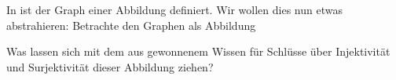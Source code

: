 \begin{exercise}
  In  ist der Graph einer Abbildung definiert. Wir wollen
  dies nun etwas abstrahieren: Betrachte den Graphen als Abbildung
  \begin{center}
  \end{center}
  Was lassen sich mit dem aus  gewonnenem Wissen für
  Schlüsse über Injektivität und Surjektivität dieser Abbildung ziehen?
\end{exercise}
